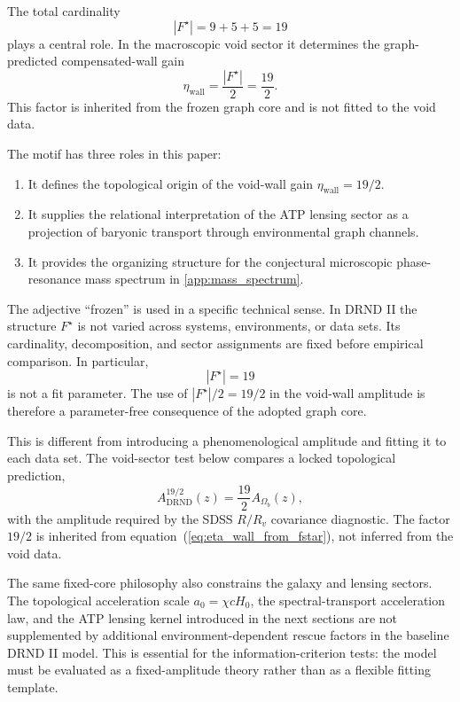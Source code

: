 \documentclass[12pt]{iopart}
\begin{document}
The total cardinality
\begin{equation}
|F^\star|=9+5+5=19
\label{eq:fstar_cardinality}
\end{equation}
plays a central role. In the macroscopic void sector it determines the graph-predicted compensated-wall gain
\begin{equation}
\eta_{\mathrm{wall}}
=
\frac{|F^\star|}{2}
=
\frac{19}{2}.
\label{eq:eta_wall_from_fstar}
\end{equation}
This factor is inherited from the frozen graph core and is not fitted to the void data.

The motif has three roles in this paper:
\begin{enumerate}
    \item It defines the topological origin of the void-wall gain \(\eta_{\mathrm{wall}}=19/2\).
    \item It supplies the relational interpretation of the ATP lensing sector as a projection of baryonic transport through environmental graph channels.
    \item It provides the organizing structure for the conjectural microscopic phase-resonance mass spectrum in \ref{app:mass_spectrum}.
\end{enumerate}

The adjective ``frozen'' is used in a specific technical sense. In DRND II the structure \(F^\star\) is not varied across systems, environments, or data sets. Its cardinality, decomposition, and sector assignments are fixed before empirical comparison. In particular,
\begin{equation}
|F^\star|=19
\end{equation}
is not a fit parameter. The use of \(|F^\star|/2=19/2\) in the void-wall amplitude is therefore a parameter-free consequence of the adopted graph core.

This is different from introducing a phenomenological amplitude and fitting it to each data set. The void-sector test below compares a locked topological prediction,
\begin{equation}
A_{\mathrm{DRND}}^{19/2}(z)
=
\frac{19}{2}A_{\Omega_b}(z),
\label{eq:adrnd_19_2_preview}
\end{equation}
with the amplitude required by the SDSS \(R/R_v\) covariance diagnostic. The factor \(19/2\) is inherited from equation~(\ref{eq:eta_wall_from_fstar}), not inferred from the void data.

The same fixed-core philosophy also constrains the galaxy and lensing sectors. The topological acceleration scale \(a_0=\chi cH_0\), the spectral-transport acceleration law, and the ATP lensing kernel introduced in the next sections are not supplemented by additional environment-dependent rescue factors in the baseline DRND II model. This is essential for the information-criterion tests: the model must be evaluated as a fixed-amplitude theory rather than as a flexible fitting template.
\end{document}

